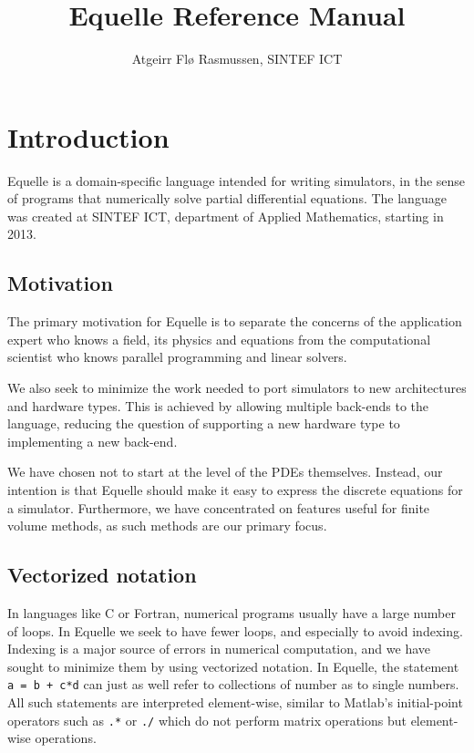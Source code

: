 \documentclass[11pt]{article}
\title{Equelle Reference Manual}
\author{Atgeirr Fl{\o} Rasmussen, SINTEF ICT}
\newcommand{\code}[1]{\texttt{#1}}
\begin{document}
\maketitle


\section{Introduction}

Equelle is a domain-specific language intended for writing simulators, in the sense of
programs that numerically solve partial differential equations. The language was created
at SINTEF ICT, department of Applied Mathematics, starting in 2013.

\subsection{Motivation}

The primary motivation for Equelle is to separate the concerns of the application expert
who knows a field, its physics and equations from the computational scientist who knows
parallel programming and linear solvers.

We also seek to minimize the work needed to port simulators to new architectures and
hardware types. This is achieved by allowing multiple back-ends to the language, reducing
the question of supporting a new hardware type to implementing a new back-end.

We have chosen not to start at the level of the PDEs themselves. Instead, our intention is
that Equelle should make it easy to express the discrete equations for a simulator.
Furthermore, we have concentrated on features useful for finite volume methods, as such
methods are our primary focus.

\subsection{Vectorized notation}

In languages like C or Fortran, numerical programs usually have a large number of
loops. In Equelle we seek to have fewer loops, and especially to avoid indexing. Indexing
is a major source of errors in numerical computation, and we have sought to minimize them
by using vectorized notation. In Equelle, the statement \code{a = b + c*d} can just as
well refer to collections of number as to single numbers. All such statements are
interpreted element-wise, similar to Matlab's initial-point operators such as
\code{.*} or \code{./} which do not perform matrix operations but element-wise
operations.
\end{document}

